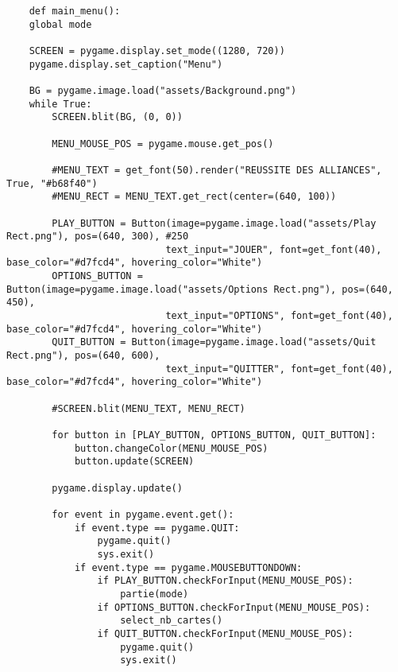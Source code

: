 	\begin{lstlisting}
	def main_menu():
    global mode 

    SCREEN = pygame.display.set_mode((1280, 720))
    pygame.display.set_caption("Menu")

    BG = pygame.image.load("assets/Background.png")
    while True:
        SCREEN.blit(BG, (0, 0))

        MENU_MOUSE_POS = pygame.mouse.get_pos()

        #MENU_TEXT = get_font(50).render("REUSSITE DES ALLIANCES", True, "#b68f40")
        #MENU_RECT = MENU_TEXT.get_rect(center=(640, 100))

        PLAY_BUTTON = Button(image=pygame.image.load("assets/Play Rect.png"), pos=(640, 300), #250
                            text_input="JOUER", font=get_font(40), base_color="#d7fcd4", hovering_color="White")
        OPTIONS_BUTTON = Button(image=pygame.image.load("assets/Options Rect.png"), pos=(640, 450), 
                            text_input="OPTIONS", font=get_font(40), base_color="#d7fcd4", hovering_color="White")
        QUIT_BUTTON = Button(image=pygame.image.load("assets/Quit Rect.png"), pos=(640, 600), 
                            text_input="QUITTER", font=get_font(40), base_color="#d7fcd4", hovering_color="White")

        #SCREEN.blit(MENU_TEXT, MENU_RECT)

        for button in [PLAY_BUTTON, OPTIONS_BUTTON, QUIT_BUTTON]:
            button.changeColor(MENU_MOUSE_POS)
            button.update(SCREEN)

        pygame.display.update()
        
        for event in pygame.event.get():
            if event.type == pygame.QUIT:
                pygame.quit()
                sys.exit()
            if event.type == pygame.MOUSEBUTTONDOWN:
                if PLAY_BUTTON.checkForInput(MENU_MOUSE_POS):
                    partie(mode)
                if OPTIONS_BUTTON.checkForInput(MENU_MOUSE_POS):
                    select_nb_cartes()
                if QUIT_BUTTON.checkForInput(MENU_MOUSE_POS):
                    pygame.quit()
                    sys.exit()
	\end{lstlisting}
	
